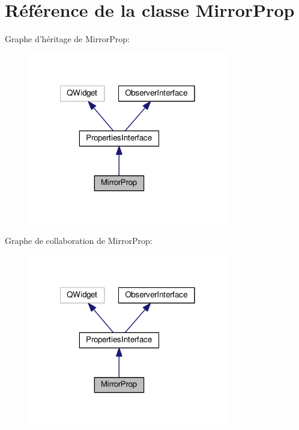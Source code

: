 \hypertarget{classMirrorProp}{\section{Référence de la classe Mirror\+Prop}
\label{classMirrorProp}
}


Graphe d'héritage de Mirror\+Prop\+:
\nopagebreak
\begin{figure}[H]
\begin{center}
\leavevmode
\includegraphics[width=247pt]{dc/d36/classMirrorProp__inherit__graph}
\end{center}
\end{figure}


Graphe de collaboration de Mirror\+Prop\+:
\nopagebreak
\begin{figure}[H]
\begin{center}
\leavevmode
\includegraphics[width=247pt]{d3/d3c/classMirrorProp__coll__graph}
\end{center}
\end{figure}
